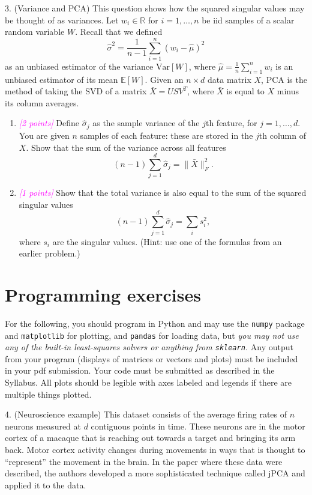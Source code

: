 \documentclass{article}
\newcommand{\R}{\mathbb{R}} %
\newcommand{\points}[1]{\small\textcolor{magenta}{\emph{[#1 points]}} \normalsize}
\begin{document}
3. (Variance and PCA)
This question shows how the squared singular values may be thought of as variances.
Let $w_i \in \R$ for $i = 1, \ldots, n$ be iid samples of a scalar random variable $W$.
Recall that we defined
\begin{equation}
  \label{eq:sample_var}
  \hat{\sigma}^2 = \frac{1}{n-1} \sum_{i=1}^n (w_i - \hat{\mu})^2
\end{equation}
as an unbiased estimator of the variance $\mathrm{Var}[W]$, where $\hat{\mu} = \frac{1}{n} \sum_{i=1}^n w_i$
is an unbiased estimator of its mean $\mathbb{E}[W]$.
Given an $n \times d$ data matrix $X$,
PCA is the method of taking the SVD of a matrix $\bar{X} = USV^T$, where
$\bar{X}$ is equal to $X$ minus its column averages.
\begin{enumerate}
\item \points{2} Define $\hat{\sigma}_j$ as the sample variance of the $j$th feature,
  for $j = 1, \ldots, d$.
  You are given $n$ samples of each feature: these are stored in the $j$th column of $X$.
  Show that the sum of the variance across all features
  $$
  (n-1) \sum_{j=1}^d \hat{\sigma}_j = \| \bar X \|_F^2.
  $$
\item \points{1} Show that the total variance is also equal to the sum of the squared singular values
  $$
  (n-1) \sum_{j=1}^d \hat{\sigma}_j = \sum_{i} s_i^2,
  $$
  where $s_i$ are the singular values. (Hint: use one of the formulas from an earlier problem.)
\end{enumerate}


\section*{Programming exercises}

For the following, you should program in Python and may use the
{\tt numpy} package and {\tt matplotlib} for plotting, and {\tt pandas} for loading data,
but {\em you may not use any of the built-in least-squares solvers or anything from {\tt sklearn}.}
Any output from your program (displays of matrices or vectors and plots) 
must be included in your pdf submission.
Your code must be submitted as described in the Syllabus.
All plots should be legible with axes labeled and legends if there are multiple things plotted.

\vspace{1em}
4. (Neuroscience example)
This dataset consists of the average firing rates of $n$ neurons measured at $d$ contiguous points in time.
These neurons are in the motor cortex of a macaque that is reaching out towards a target 
and bringing its arm back.
Motor cortex activity changes during movements in ways that is thought to ``represent''
the movement in the brain.
In the paper where these data were described, the authors developed a more sophisticated technique
called jPCA and applied it to the data.
\end{document}
